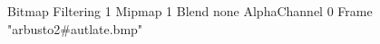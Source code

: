 {Bitmap
	{Filtering 1}
	{Mipmap 1}
	{Blend none}
	{AlphaChannel 0}
	{Frame "arbusto2#autlate.bmp"}
}

